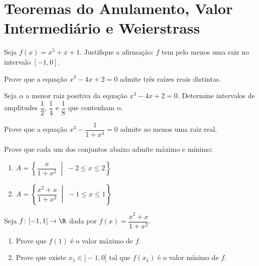 \setcounter{section}{4}
\setcounter{subsection}{0}

\section{Teoremas do Anulamento, Valor Intermediário e Weierstrass}

\begin{exercicio}[1]
Seja $f(x) = x^5 + x + 1$. Justifique a afirmação: $f$ tem pelo menos uma raiz no intervalo $[-1, 0]$.
\end{exercicio}

\begin{exercicio}[2]
Prove que a equação $x^3 - 4x + 2 = 0$ admite três raízes reais distintas.
\end{exercicio}

\begin{exercicio}[3]
Seja $\alpha$ a menor raiz positiva da equação $x^3 - 4x + 2 = 0$. Determine intervalos de amplitudes $\dfrac{1}{2}$, $\dfrac{1}{4}$ e $\dfrac{1}{8}$ que contenham $\alpha$.
\end{exercicio}

\begin{exercicio}[4]
Prove que a equação $x^3 - \dfrac{1}{1 + x^4} = 0$ admite ao menos uma raiz real.
\end{exercicio}

\begin{exercicio}[5]
Prove que cada um dos conjuntos abaixo admite máximo e mínimo:
\begin{enumerate}[label=\alph*)]
    \item $A = \left\{ \dfrac{x}{1 + x^2} \;\middle|\; -2 \le x \le 2 \right\}$
    \item $A = \left\{ \dfrac{x^2 + x}{1 + x^2} \;\middle|\; -1 \le x \le 1 \right\}$
\end{enumerate}
\end{exercicio}

\begin{exercicio}[6]
Seja $f\colon [-1, 1] \to \R$ dada por $f(x) = \dfrac{x^2 + x}{1 + x^2}$.
\begin{enumerate}[label=\alph*)]
    \item Prove que $f(1)$ é o valor máximo de $f$.
    \item Prove que existe $x_1 \in {]-1, 0[}$ tal que $f(x_1)$ é o valor mínimo de $f$.
\end{enumerate}
\end{exercicio}

